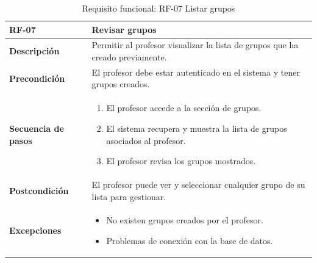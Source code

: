 \begin{table}[H]
\centering
\begin{tabularx}{\textwidth}{
  |>{\centering\arraybackslash}l
  |>{\centering\arraybackslash}X|}
\hline
\textbf{RF-07} & \textbf{Revisar grupos} \\ \hline

\textbf{Descripción} & Permitir al profesor visualizar la lista de grupos que ha creado previamente. \\ \hline

\textbf{Precondición} & El profesor debe estar autenticado en el sistema y tener grupos creados. \\ \hline

\textbf{Secuencia de pasos} & 
\begin{enumerate}
  \item El profesor accede a la sección de grupos.
  \item El sistema recupera y muestra la lista de grupos asociados al profesor.
  \item El profesor revisa los grupos mostrados.
\end{enumerate} \\ \hline

\textbf{Postcondición} & El profesor puede ver y seleccionar cualquier grupo de su lista para gestionar. \\ \hline

\textbf{Excepciones} & 
\begin{itemize}
  \item No existen grupos creados por el profesor.
  \item Problemas de conexión con la base de datos.
\end{itemize} \\ \hline
\end{tabularx}
\caption{Requisito funcional: RF-07 Listar grupos}
\end{table}


